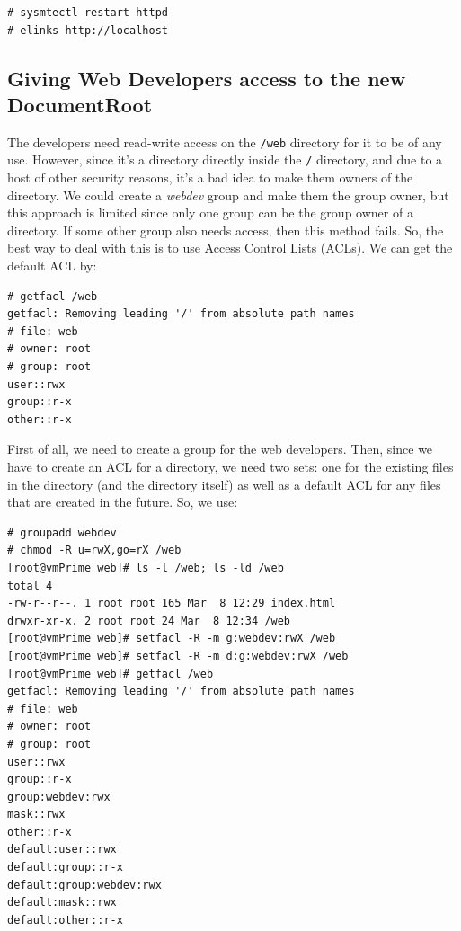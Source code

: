 \vspace{-15pt}
\begin{verbatim}
# sysmtectl restart httpd
# elinks http://localhost
\end{verbatim}
\vspace{-10pt}	

\subsection{Giving Web Developers access to the new DocumentRoot}
The developers need read-write access on the \verb|/web| directory for it to be of any use. However, since it's a directory directly inside the \verb|/| directory, and due to a host of other security reasons, it's a bad idea to make them owners of the directory. We could create a \textit{webdev} group and make them the group owner, but this approach is limited since only one group can be the group owner of a directory. If some other group also needs access, then this method fails. So, the best way to deal with this is to use Access Control Lists (ACLs). We can get the default ACL by:

\vspace{-15pt}
\begin{verbatim}
# getfacl /web
getfacl: Removing leading '/' from absolute path names
# file: web
# owner: root
# group: root
user::rwx
group::r-x
other::r-x
\end{verbatim}
\vspace{-10pt}	

\noindent
First of all, we need to create a group for the web developers. Then, since we have to create an ACL for a directory, we need two sets: one for the existing files in the directory (and the directory itself) as well as a default ACL for any files that are created in the future. So, we use:

\vspace{-15pt}
\begin{verbatim}
# groupadd webdev
# chmod -R u=rwX,go=rX /web
[root@vmPrime web]# ls -l /web; ls -ld /web
total 4
-rw-r--r--. 1 root root 165 Mar  8 12:29 index.html
drwxr-xr-x. 2 root root 24 Mar  8 12:34 /web
[root@vmPrime web]# setfacl -R -m g:webdev:rwX /web
[root@vmPrime web]# setfacl -R -m d:g:webdev:rwX /web
[root@vmPrime web]# getfacl /web
getfacl: Removing leading '/' from absolute path names
# file: web
# owner: root
# group: root
user::rwx
group::r-x
group:webdev:rwx
mask::rwx
other::r-x
default:user::rwx
default:group::r-x
default:group:webdev:rwx
default:mask::rwx
default:other::r-x
\end{verbatim}
\vspace{-10pt}	

